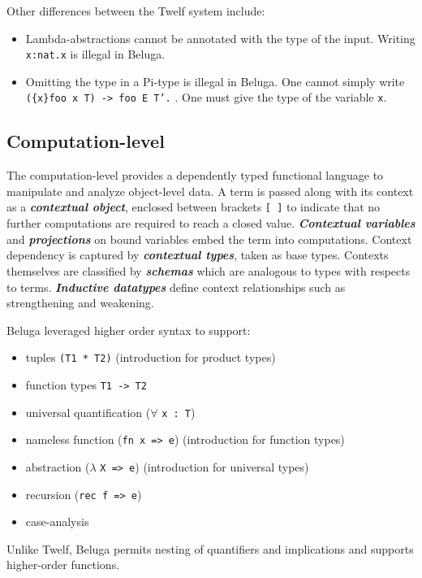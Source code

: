 \documentclass[11pt]{article}
\begin{document}
Other differences between the Twelf system include:
\begin{itemize}
\item Lambda-abstractions cannot be annotated with the type of the input. Writing \texttt{\\x:nat.x} is illegal in Beluga.
\item Omitting the type in a Pi-type is illegal in Beluga. One cannot simply write \texttt{(\{x\}foo x T) -> foo E T'.} . One must give the type of the variable \texttt{x}.
\end{itemize}



\subsection{Computation-level}
The computation-level provides a dependently typed functional language to manipulate and analyze object-level data. A term is passed along with its context as a \textbf{\textit{contextual object}}, enclosed between brackets \texttt{[ ]} to indicate that no further computations are required to reach a closed value. \textbf{\textit{Contextual variables}} and \textbf{\textit{projections}} on bound variables embed the term into computations. Context dependency is captured by \textit{\textbf{contextual types}}, taken as base types. Contexts themselves are classified by \textit{\textbf{schemas}} which are analogous to types with respects to terms. \textit{\textbf{Inductive datatypes}} define context relationships such as strengthening and weakening.

Beluga leveraged higher order syntax to support: 
\begin{itemize}
\item tuples \texttt{(T1 * T2)} (introduction for product types)
\item function types \texttt{T1 -> T2}
\item universal quantification ($\forall$ \texttt{x : T})
\item nameless function (\texttt{fn x => e}) (introduction for function types)
\item abstraction ($\lambda$ \texttt{X => e}) (introduction for universal types)
\item recursion (\texttt{rec f => e})
\item case-analysis 
\end{itemize}
Unlike Twelf, Beluga permits nesting of quantifiers and implications and supports higher-order functions. 
\end{document}
